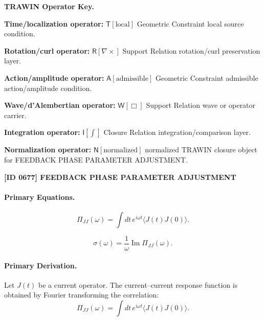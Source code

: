 \par\vspace{0.45\baselineskip}
\noindent\begin{minipage}[t]{\linewidth}
\begingroup
\small
\raggedright
\textbf{TRAWIN Operator Key.}\par
\noindent\textbf{Time/localization operator:} $\mathsf{T}\!\left[\mathrm{local}\right]$ Geometric Constraint local source condition.\par
\noindent\textbf{Rotation/curl operator:} $\mathsf{R}\!\left[\nabla\times\right]$ Support Relation rotation/curl preservation layer.\par
\noindent\textbf{Action/amplitude operator:} $\mathsf{A}\!\left[\mathrm{admissible}\right]$ Geometric Constraint admissible action/amplitude condition.\par
\noindent\textbf{Wave/d'Alembertian operator:} $\mathsf{W}\!\left[\Box\right]$ Support Relation wave or operator carrier.\par
\noindent\textbf{Integration operator:} $\mathsf{I}\!\left[\int\right]$ Closure Relation integration/comparison layer.\par
\noindent\textbf{Normalization operator:} $\mathsf{N}\!\left[\mathrm{normalized}\right]$ normalized TRAWIN closure object for FEEDBACK PHASE PARAMETER ADJUSTMENT.\par
\endgroup
\end{minipage}

\clearpage
\noindent\textbf{[ID 0677] FEEDBACK PHASE PARAMETER ADJUSTMENT}\par
\vspace{0.35em}
\paragraph{Primary Equations.}
\begin{equation}
\Pi_{JJ}(\omega)
=
\int
dt\,
e^{i\omega t}
\langle J(t)J(0)\rangle .
\end{equation}

\begin{equation}
\sigma(\omega)
=
\frac{1}{\omega}
\operatorname{Im}\Pi_{JJ}(\omega).
\end{equation}

\paragraph{Primary Derivation.}
Let $J(t)$ be a current operator.  
The current--current response function is obtained by Fourier transforming the correlation:
\begin{equation}
\Pi_{JJ}(\omega)
=
\int
dt\,
e^{i\omega t}
\langle J(t)J(0)\rangle .
\end{equation}

